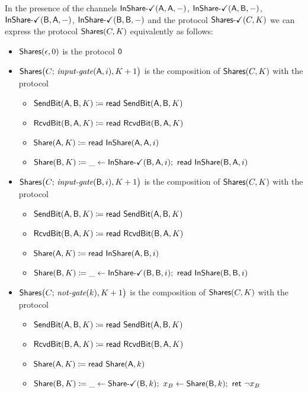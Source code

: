 \noindent In the presence of the channels $\InShareOk(\A,\A,-)$, $\InShareOk(\A,\B,-)$, $\InShareOk(\B,\A,-)$, $\InShareOk(\B,\B,-)$ and the protocol $\SharesOk(C,K)$ we can express the protocol $\Shares(C,K)$ equivalently as follows:

\begin{itemize}
\item $\Shares(\epsilon,0)$ is the protocol $\zero$

\item $\Shares\big(C; \, \inputgate(\A,i),K+1\big)$ is the composition of $\Shares(C,K)$ with the protocol
\begin{itemize}
\item $\SendBit(\A,\B,K) \coloneqq \read{\SendBit(\A,\B,K)}$
\item $\RcvdBit(\B,\A,K) \coloneqq \read{\RcvdBit(\B,\A,K)}$
\item $\Share(\A,K) \coloneqq \read{\InShare(\A,\A,i)}$
\item $\Share(\B,K) \coloneqq \_ \leftarrow \InShareOk(\B,\A,i); \ \read{\InShare(\B,\A,i)}$
\end{itemize}

\item $\Shares\big(C; \, \inputgate(\B,i),K+1\big)$ is the composition of $\Shares(C,K)$ with the protocol
\begin{itemize}
\item $\SendBit(\A,\B,K) \coloneqq \read{\SendBit(\A,\B,K)}$
\item $\RcvdBit(\B,\A,K) \coloneqq \read{\RcvdBit(\B,\A,K)}$
\item $\Share(\A,K) \coloneqq \read{\InShare(\A,\B,i)}$
\item $\Share(\B,K) \coloneqq \_ \leftarrow \InShareOk(\B,\B,i); \ \read{\InShare(\B,\B,i)}$
\end{itemize}

\item $\Shares\big(C; \, \notgate(k),K+1\big)$ is the composition of $\Shares(C,K)$ with the protocol
\begin{itemize}
\item $\SendBit(\A,\B,K) \coloneqq \read{\SendBit(\A,\B,K)}$
\item $\RcvdBit(\B,\A,K) \coloneqq \read{\RcvdBit(\B,\A,K)}$
\item $\Share(\A,K) \coloneqq \read{\Share(\A,k)}$
\item $\Share(\B,K) \coloneqq \_ \leftarrow \ShareOk(\B,k); \ x_B \leftarrow \Share(\B,k); \ \ret{\neg x_B}$
\end{itemize}


\end{itemize}

